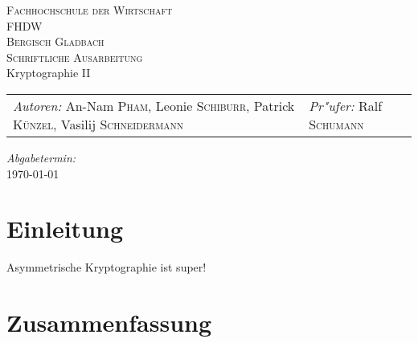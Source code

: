\documentclass[a4paper, fontsize=12pt, toc=bibliographynumbered]{scrreprt}
\begin{document}
\newcommand{\headerrule}{\tabucline -}
\newcommand{\abbildung}[2]{\begin{figure}\centering
    \fbox{\texttt{[image: \#1]}}\caption{#2}
    \label{fig:#1}\end{figure}}

\author{}
\begin{titlepage}
  \begin{center}
    \textsc{\large Fachhochschule der Wirtschaft\\FHDW}\\[1em]
    \textsc{\large Bergisch Gladbach}\\[2em]
    \textsc{Schriftliche Ausarbeitung}\\[6em]
    {\LARGE Kryptographie II}\\[25em]
    \begin{tabu} to 0.8\textwidth {X[l] X[r]}
      \emph{Autoren:}\linebreak
      An-Nam \textsc{Pham},\linebreak
      Leonie \textsc{Schiburr},\linebreak
      Patrick \textsc{Künzel},\linebreak
      Vasilij \textsc{Schneidermann}
      &
      \emph{Pr"ufer:}\linebreak
      Ralf \textsc{Schumann}
    \end{tabu}
    \vfill
    \emph{Abgabetermin:}\\
    \today
  \end{center}
\end{titlepage}

\tableofcontents
\listoffigures
\listoftables
\clearpage
{}
\setcounter{page}{1}



\author{Vasilij Schneidermann}
\chapter{Einleitung}

Asymmetrische Kryptographie ist super!






\author{}
\chapter{Zusammenfassung}
\end{document}
